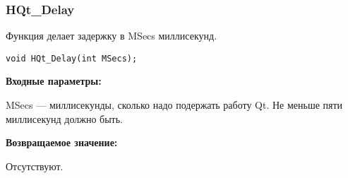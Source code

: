 \documentclass[a4paper,12pt]{article}
\begin{document}
\subsubsection{HQt\_Delay}\label{HQt_Delay}

Функция делает задержку в MSecs миллисекунд.


\begin{lstlisting}[label=code_syntax_HQt_Delay,caption=Синтаксис]
void HQt_Delay(int MSecs);
\end{lstlisting}

\textbf{Входные параметры:}

MSecs --- миллисекунды, сколько надо подержать работу Qt. Не меньше пяти миллисекунд должно быть.

\textbf{Возвращаемое значение:}

Отсутствуют.

\end{document}
